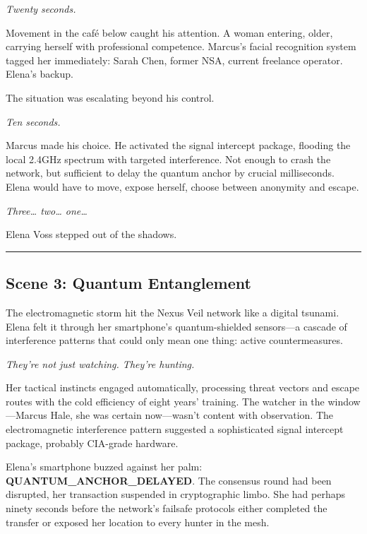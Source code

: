 \emph{Twenty seconds.}

Movement in the café below caught his attention. A woman entering, older, carrying herself with professional competence. Marcus's facial recognition system tagged her immediately: Sarah Chen, former NSA, current freelance operator. Elena's backup.

The situation was escalating beyond his control.

\emph{Ten seconds.}

Marcus made his choice. He activated the signal intercept package, flooding the local 2.4GHz spectrum with targeted interference. Not enough to crash the network, but sufficient to delay the quantum anchor by crucial milliseconds. Elena would have to move, expose herself, choose between anonymity and escape.

\emph{Three\ldots{} two\ldots{} one\ldots{}}

Elena Voss stepped out of the shadows.

\begin{center}\rule{0.5\linewidth}{0.5pt}\end{center}

\hypertarget{scene-3-quantum-entanglement}{%
\subsection{Scene 3: Quantum Entanglement}\label{scene-3-quantum-entanglement}}

The electromagnetic storm hit the Nexus Veil network like a digital tsunami. Elena felt it through her smartphone's quantum-shielded sensors---a cascade of interference patterns that could only mean one thing: active countermeasures.

\emph{They're not just watching. They're hunting.}

Her tactical instincts engaged automatically, processing threat vectors and escape routes with the cold efficiency of eight years' training. The watcher in the window---Marcus Hale, she was certain now---wasn't content with observation. The electromagnetic interference pattern suggested a sophisticated signal intercept package, probably CIA-grade hardware.

Elena's smartphone buzzed against her palm: \textbf{QUANTUM\_ANCHOR\_DELAYED}. The consensus round had been disrupted, her transaction suspended in cryptographic limbo. She had perhaps ninety seconds before the network's failsafe protocols either completed the transfer or exposed her location to every hunter in the mesh.

